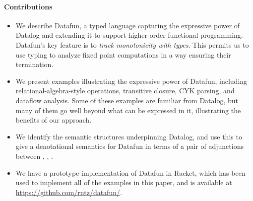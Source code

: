 \paragraph{Contributions}
\begin{itemize}
\item We describe Datafun, a typed language capturing the expressive power of
  Datalog and extending it to support higher-order functional programming.
  Datafun's key feature is to \emph{track monotonicity with types}. This permits
  us to use typing to analyze fixed point computations in a way ensuring their
  termination.

\item We present examples illustrating the expressive power of Datafun,
  including relational-algebra-style operations, transitive closure, CYK
  parsing, and dataflow analysis. Some of these examples are familiar from
  Datalog, but many of them go well beyond what can be expressed in it,
  illustrating the benefits of our approach.

\item We identify the semantic structures underpinning Datalog, and
  use this to give a denotational semantics for Datafun in terms of a
  pair of adjunctions between \cSet{}, \cPoset{}, \cSL{}.

\item We have a prototype implementation of Datafun in Racket, which
  has been used to implement all of the examples in this paper, and is
  available at \url{https://github.com/rntz/datafun/}. 
\end{itemize}







